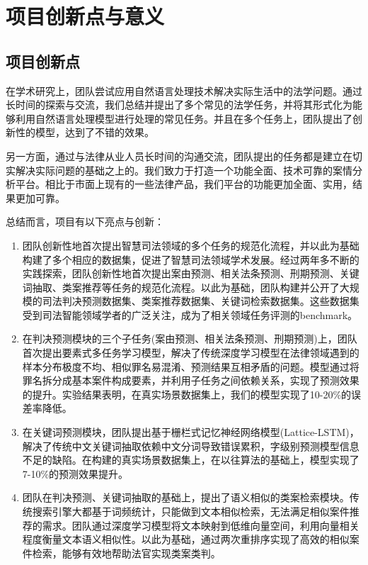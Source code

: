 \chapter{项目创新点与意义}
\label{cha: significance}

\section{项目创新点}

在学术研究上，团队尝试应用自然语言处理技术解决实际生活中的法学问题。通过长时间的探索与交流，我们总结并提出了多个常见的法学任务，并将其形式化为能够利用自然语言处理模型进行处理的常见任务。并且在多个任务上，团队提出了创新性的模型，达到了不错的效果。

另一方面，通过与法律从业人员长时间的沟通交流，团队提出的任务都是建立在切实解决实际问题的基础之上的。我们致力于打造一个功能全面、技术可靠的案情分析平台。相比于市面上现有的一些法律产品，我们平台的功能更加全面、实用，结果更加可靠。

总结而言，项目有以下亮点与创新：

\begin{enumerate}[1)]
	\item 团队创新性地首次提出智慧司法领域的多个任务的规范化流程，并以此为基础构建了多个相应的数据集，促进了智慧司法领域学术发展。经过两年多不断的实践探索，团队创新性地首次提出案由预测、相关法条预测、刑期预测、关键词抽取、类案推荐等任务的规范化流程。以此为基础，团队构建并公开了大规模的司法判决预测数据集、类案推荐数据集、关键词检索数据集。这些数据集受到司法智能领域学者的广泛关注，成为了相关领域任务评测的benchmark。
	\item 在判决预测模块的三个子任务(案由预测、相关法条预测、刑期预测)上，团队首次提出要素式多任务学习模型，解决了传统深度学习模型在法律领域遇到的样本分布极度不均、相似罪名易混淆、预测结果互相矛盾的问题。模型通过将罪名拆分成基本案件构成要素，并利用子任务之间依赖关系，实现了预测效果的提升。实验结果表明，在真实场景数据集上，我们的模型实现了10-20\%的误差率降低。
	\item 在关键词预测模块，团队提出基于栅栏式记忆神经网络模型(Lattice-LSTM)，解决了传统中文关键词抽取依赖中文分词导致错误累积，字级别预测模型信息不足的缺陷。在构建的真实场景数据集上，在以往算法的基础上，模型实现了7-10\%的预测效果提升。
	\item 团队在判决预测、关键词抽取的基础上，提出了语义相似的类案检索模块。传统搜索引擎大都基于词频统计，只能做到文本相似检索，无法满足相似案件推荐的需求。团队通过深度学习模型将文本映射到低维向量空间，利用向量相关程度衡量文本语义相似性。以此为基础，通过两次重排序实现了高效的相似案件检索，能够有效地帮助法官实现类案类判。
\end{enumerate}

